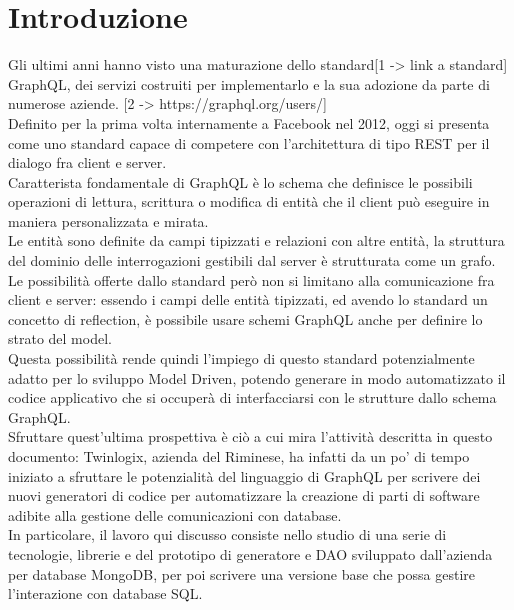 \documentclass[a4paper, 12pt]{scrartcl}
\begin{document}
    
    
    \section*{Introduzione}
    Gli ultimi anni hanno visto una maturazione dello standard[1 -> link a standard] GraphQL, dei servizi costruiti per implementarlo e la sua adozione da parte di numerose aziende. [2 -> https://graphql.org/users/] \\
    Definito per la prima volta internamente a Facebook nel 2012, oggi si presenta come uno standard capace di competere con l'architettura di tipo REST per il dialogo fra client e server. \\
    Caratterista fondamentale di GraphQL è lo schema che definisce le possibili operazioni di lettura, scrittura o modifica di entità che il client può eseguire in maniera personalizzata e mirata. \\
    Le entità sono definite da campi tipizzati e relazioni con altre entità, la struttura del dominio delle interrogazioni gestibili dal server è strutturata come un grafo. \\

    Le possibilità offerte dallo standard però non si limitano alla comunicazione fra client e server: essendo i campi delle entità tipizzati, ed avendo lo standard un concetto di reflection, è possibile usare 
    schemi GraphQL anche per definire lo strato del model. \\
    Questa possibilità rende quindi l'impiego di questo standard potenzialmente adatto per lo sviluppo Model Driven, potendo generare in modo automatizzato il codice applicativo che si occuperà di interfacciarsi con le strutture dallo schema GraphQL. \\

    Sfruttare quest'ultima prospettiva è ciò a cui mira l'attività descritta in questo documento: Twinlogix, azienda del Riminese, ha infatti da un po' di tempo iniziato a sfruttare le potenzialità del linguaggio di GraphQL per scrivere dei nuovi generatori
    di codice per automatizzare la creazione di parti di software adibite alla gestione delle comunicazioni con database. \\
    In particolare, il lavoro qui discusso consiste nello studio di una serie di tecnologie, librerie e del prototipo di generatore e DAO sviluppato dall'azienda per database MongoDB, per poi scrivere una versione base che possa gestire l'interazione con database SQL. \\
    \newpage
\end{document}
